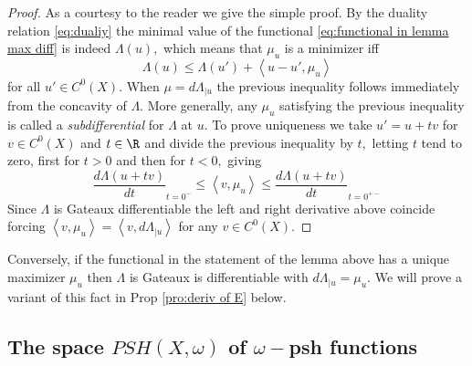 \documentclass[11pt,oneside,english]{amsart}
\numberwithin{equation}{section}
\numberwithin{figure}{section}
\theoremstyle{plain}
\theoremstyle{plain}
\theoremstyle{plain}
\theoremstyle{plain}
\theoremstyle{remark}
\theoremstyle{definition}
\begin{document}
\begin{proof}
As a courtesy to the reader we give the simple proof. By the duality
relation \ref{eq:dualiy} the minimal value of the functional \ref{eq:functional in lemma max diff}
is indeed $\Lambda(u),$ which means that $\mu_{u}$ is a minimizer
iff 
\[
\Lambda(u)\leq\Lambda(u')+\left\langle u-u',\mu_{u}\right\rangle 
\]
 for all $u'\in C^{0}(X).$ When $\mu=d\Lambda_{|u}$ the previous
inequality follows immediately from the concavity of $\Lambda.$ More
generally, any $\mu_{u}$ satisfying the previous inequality is called
a \emph{subdifferential} for $\Lambda$ at $u.$ To prove uniqueness
we take $u'=u+tv$ for $v\in C^{0}(X)$ and $t\in\R$ and divide the
previous inequality by $t,$ letting $t$ tend to zero, first for
$t>0$ and then for $t<0,$ giving 
\[
\frac{d\Lambda(u+tv)}{dt}_{t=0^{-}}\leq\left\langle v,\mu_{u}\right\rangle \leq\frac{d\Lambda(u+tv)}{dt}_{t=0^{+-}}
\]
 Since $\Lambda$ is Gateaux differentiable the left and right derivative
above coincide forcing $\left\langle v,\mu_{u}\right\rangle =\left\langle v,d\Lambda_{|u}\right\rangle $
for any $v\in C^{0}(X).$ 
\end{proof}
Conversely, if the functional in the statement of the lemma above
has a unique maximizer $\mu_{u}$ then $\Lambda$ is Gateaux is differentiable
with $d\Lambda_{|u}=\mu_{u}.$ We will prove a variant of this fact
in Prop \ref{pro:deriv of E} below.

\subsection{The space $PSH(X,\omega)$ of $\omega-$psh\label{sub:The-space-}
functions}
\end{document}
